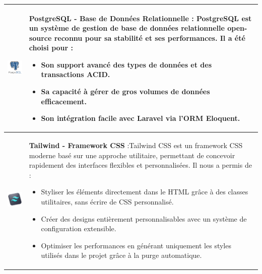 \begin{longtable}{|m{4cm}|m{10cm}|}
    \includegraphics[width=3cm]{images/logo/postgresql.png} & 
    \textbf{PostgreSQL - Base de Données Relationnelle} : PostgreSQL est un système de gestion de base de données relationnelle open-source reconnu pour sa stabilité et ses performances. Il a été choisi pour :  
    \begin{itemize}
        \item Son support avancé des types de données et des transactions ACID.
        \item Sa capacité à gérer de gros volumes de données efficacement.
        \item Son intégration facile avec Laravel via l'ORM Eloquent.
    \end{itemize}\\
    \hline

    \includegraphics[width=3cm]{images/logo/tail.png} & 
    \textbf{Tailwind - Framework CSS} :Tailwind CSS est un framework CSS moderne basé sur une approche utilitaire, permettant de concevoir rapidement des interfaces flexibles et personnalisées. Il nous a permis de :
    \begin{itemize}
        \item Styliser les éléments directement dans le HTML grâce à des classes utilitaires, sans écrire de CSS personnalisé.
\item Créer des designs entièrement personnalisables avec un système de configuration extensible.
\item Optimiser les performances en générant uniquement les styles utilisés dans le projet grâce à la purge automatique.
    \end{itemize}\\
    \hline


\end{longtable}
